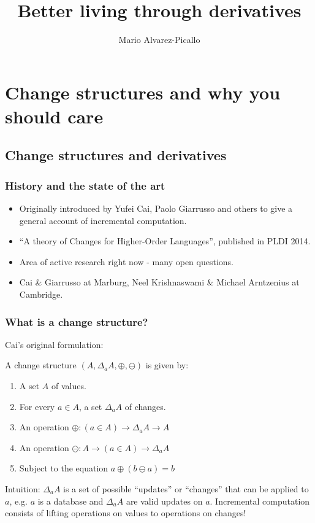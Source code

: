 \documentclass[english]{beamer}
\title{Better living through derivatives}
\author{Mario Alvarez-Picallo}
\theoremstyle{plain}
\theoremstyle{remark}
\theoremstyle{remark}
\theoremstyle{remark}
\theoremstyle{definition}
\theoremstyle{definition}
\newcommand{\ra}[0]{\rightarrow}
\begin{document}
\frame\titlepage

\section{Change structures and why you should care}

\subsection{Change structures and derivatives}

\begin{frame}
  \frametitle{History and the state of the art}
  \begin{itemize}
    
  \item Originally introduced by Yufei Cai, Paolo Giarrusso and others to give a general
    account of incremental computation.
    \vfill
  \item ``A theory of Changes for Higher-Order Languages'', published in PLDI 2014.
    \vfill
  \item Area of active research right now - many open questions.
    \vfill
  \item Cai \& Giarrusso at Marburg, Neel Krishnaswami \& Michael Arntzenius at Cambridge.
  \end{itemize}
\end{frame}

\begin{frame}
  \frametitle{What is a change structure?}
  Cai's original formulation:
  \begin{definition}
    A change structure $(A, \Delta_a A, \oplus, \ominus)$ is given by:
    \begin{enumerate}
    \item A set $A$ of values.
    \item For every $a \in A$, a set $\Delta_a A$ of changes.
    \item An operation $\oplus : (a \in A) \ra \Delta_a A \ra A$
    \item An operation $\ominus : A \ra (a \in A) \ra \Delta_a A$
    \item Subject to the equation $a \oplus (b \ominus a) = b$
    \end{enumerate}
  \end{definition}
  \vfill
  Intuition: $\Delta_a A$ is a set of possible ``updates'' or ``changes'' that can be applied
  to $a$, e.g. $a$ is a database and $\Delta_a A$ are valid updates on $a$.
  \vfill
  Incremental computation consists of lifting operations on values to operations on changes!
\end{frame}
\end{document}
